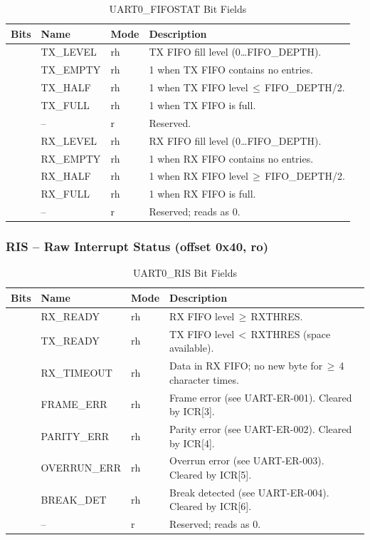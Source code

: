 \begin{table}[H]
\caption{UART0\_FIFOSTAT Bit Fields}
\label{tab:asUartFIFOSTAT}
\centering
\begin{tabularx}{\textwidth}{|l |l |l |X|}
  \hline
  Bits & Name & Mode & Description \\
  \hline
  \hline
  [4:0]  & TX\_LEVEL & rh & TX FIFO fill level (0\ldots FIFO\_DEPTH). \\
  \hline
  [5]    & TX\_EMPTY & rh & 1 when TX FIFO contains no entries. \\
  \hline
  [6]    & TX\_HALF  & rh & 1 when TX FIFO level\,$\leq$\,FIFO\_DEPTH/2. \\
  \hline
  [7]    & TX\_FULL  & rh & 1 when TX FIFO is full. \\
  \hline
  [15:8] & --        & r  & Reserved. \\
  \hline
  [20:16] & RX\_LEVEL & rh & RX FIFO fill level (0\ldots FIFO\_DEPTH). \\
  \hline
  [21]   & RX\_EMPTY & rh & 1 when RX FIFO contains no entries. \\
  \hline
  [22]   & RX\_HALF  & rh & 1 when RX FIFO level\,$\geq$\,FIFO\_DEPTH/2. \\
  \hline
  [23]   & RX\_FULL  & rh & 1 when RX FIFO is full. \\
  \hline
  [63:24] & --        & r  & Reserved; reads as 0. \\
  \hline
\end{tabularx}
\end{table}

\subsubsection{RIS -- Raw Interrupt Status (offset 0x40, ro)}

\begin{table}[H]
\caption{UART0\_RIS Bit Fields}
\label{tab:asUartRIS}
\centering
\begin{tabularx}{\textwidth}{|l |l |l |X|}
  \hline
  Bits & Name & Mode & Description \\
  \hline
  \hline
  [0]    & RX\_READY   & rh  & RX FIFO level\,$\geq$\,RXTHRES. \\
  \hline
  [1]    & TX\_READY   & rh  & TX FIFO level\,$<$\,RXTHRES (space available). \\
  \hline
  [2]    & RX\_TIMEOUT & rh  & Data in RX FIFO; no new byte for\,$\geq$\,4 character times. \\
  \hline
  [3]    & FRAME\_ERR  & rh  & Frame error (see UART-ER-001). Cleared by ICR[3]. \\
  \hline
  [4]    & PARITY\_ERR & rh  & Parity error (see UART-ER-002). Cleared by ICR[4]. \\
  \hline
  [5]    & OVERRUN\_ERR & rh & Overrun error (see UART-ER-003). Cleared by ICR[5]. \\
  \hline
  [6]    & BREAK\_DET  & rh  & Break detected (see UART-ER-004). Cleared by ICR[6]. \\
  \hline
  [63:7] & --           & r   & Reserved; reads as 0. \\
  \hline
\end{tabularx}
\end{table}

